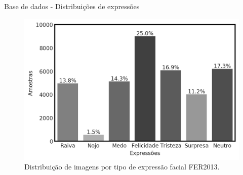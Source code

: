 \begin{frame}{Base de dados - Distribuições de expressões}

\begin{figure}
    \centering
    \includegraphics[width=0.9\linewidth]{img/expression_distribution.png}
    \caption{Distribuição de imagens por tipo de expressão facial FER2013.}
\end{figure}

\end{frame}

